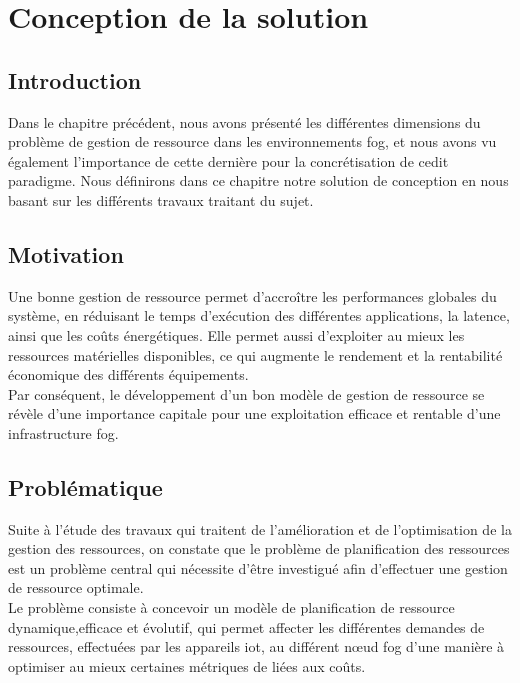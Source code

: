 \chapter{Conception de la solution}
\section{Introduction}
Dans le chapitre précédent, nous avons présenté les différentes dimensions du problème de gestion de ressource dans les environnements fog, et nous avons vu également l’importance de cette dernière pour la concrétisation de cedit paradigme.
Nous définirons dans ce chapitre notre solution de conception en nous basant sur les différents travaux traitant du sujet.
\section{Motivation}
Une bonne gestion de ressource permet d'accroître les performances globales du système, en réduisant le temps d'exécution des différentes applications, la latence, ainsi que les coûts énergétiques. Elle permet aussi d’exploiter au mieux les ressources matérielles disponibles, ce qui augmente le rendement et la rentabilité économique des différents équipements.\\ 
Par conséquent, le développement d’un bon modèle de gestion de ressource se révèle d’une importance capitale pour une exploitation efficace et rentable d’une infrastructure fog.
\section{Problématique}
Suite à l’étude des travaux qui traitent de l’amélioration et de l’optimisation de la gestion des ressources, on constate que le problème de planification des ressources est un problème central qui nécessite d'être investigué afin d’effectuer une gestion de ressource optimale. \\
Le problème consiste à concevoir un modèle de planification de ressource dynamique,efficace et évolutif, qui permet affecter les différentes demandes de ressources, effectuées par les appareils iot, au différent nœud fog d’une manière à optimiser au mieux certaines métriques de liées aux coûts.

